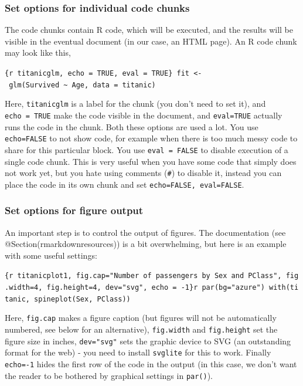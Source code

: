 \documentclass[]{book}
\begin{document}
\hypertarget{set-options-for-individual-code-chunks}{%
\subsubsection*{Set options for individual code chunks}\label{set-options-for-individual-code-chunks}}

The code chunks contain R code, which will be executed, and the results will be visible in the eventual document (in our case, an HTML page). An R code chunk may look like this,

\texttt{\{r\ titanicglm,\ echo\ =\ TRUE,\ eval\ =\ TRUE\}\ fit\ \textless{}-\ glm(Survived\ \textasciitilde{}\ Age,\ data\ =\ titanic)}

Here, \texttt{titanicglm} is a label for the chunk (you don't need to set it), and \texttt{echo\ =\ TRUE} make the code visible in the document, and \texttt{eval=TRUE} actually runs the code in the chunk. Both these options are used a lot. You use \texttt{echo=FALSE} to not show code, for example when there is too much messy code to share for this particular block. You use \texttt{eval\ =\ FALSE} to disable execution of a single code chunk. This is very useful when you have some code that simply does not work yet, but you hate using comments (\texttt{\#}) to disable it, instead you can place the code in its own chunk and set \texttt{echo=FALSE,\ eval=FALSE}.

\hypertarget{set-options-for-figure-output}{%
\subsubsection*{Set options for figure output}\label{set-options-for-figure-output}}

An important step is to control the output of figures. The documentation (see @Section(rmarkdownresources)) is a bit overwhelming, but here is an example with some useful settings:

\texttt{\{r\ titanicplot1,\ fig.cap="Number\ of\ passengers\ by\ Sex\ and\ PClass",\ fig.width=4,\ fig.height=4,\ dev="svg",\ echo\ =\ -1\}\textasciigrave{}r\textquotesingle{}\textquotesingle{}\textasciigrave{}\ par(bg="azure")\ with(titanic,\ spineplot(Sex,\ PClass))}

Here, \texttt{fig.cap} makes a figure caption (but figures will not be automatically numbered, see below for an alternative), \texttt{fig.width} and \texttt{fig.height} set the figure size in inches, \texttt{dev="svg"} sets the graphic device to SVG (an outstanding format for the web) - you need to install \texttt{svglite} for this to work. Finally \texttt{echo=-1} hides the first row of the code in the output (in this case, we don't want the reader to be bothered by graphical settings in \texttt{par()}).
\end{document}
